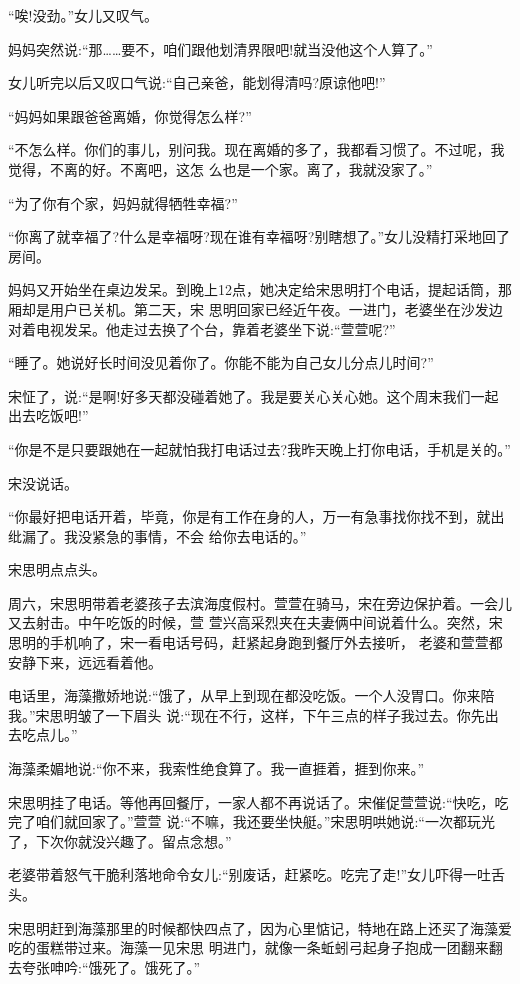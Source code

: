 \documentclass[11pt,a4paper,onecolumn]{article}
\begin{document}
``唉!没劲。''女儿又叹气。

妈妈突然说:``那……要不，咱们跟他划清界限吧!就当没他这个人算了。''

女儿听完以后又叹口气说:``自己亲爸，能划得清吗?原谅他吧!''

``妈妈如果跟爸爸离婚，你觉得怎么样?''

``不怎么样。你们的事儿，别问我。现在离婚的多了，我都看习惯了。不过呢，我觉得，不离的好。不离吧，这怎
么也是一个家。离了，我就没家了。''

``为了你有个家，妈妈就得牺牲幸福?''

``你离了就幸福了?什么是幸福呀?现在谁有幸福呀?别瞎想了。''女儿没精打采地回了房间。

妈妈又开始坐在桌边发呆。到晚上12点，她决定给宋思明打个电话，提起话筒，那厢却是用户已关机。第二天，宋
思明回家已经近午夜。一进门，老婆坐在沙发边对着电视发呆。他走过去换了个台，靠着老婆坐下说:``萱萱呢?''

``睡了。她说好长时间没见着你了。你能不能为自己女儿分点儿时间?''

宋怔了，说:``是啊!好多天都没碰着她了。我是要关心关心她。这个周末我们一起出去吃饭吧!''

``你是不是只要跟她在一起就怕我打电话过去?我昨天晚上打你电话，手机是关的。''

宋没说话。

``你最好把电话开着，毕竟，你是有工作在身的人，万一有急事找你找不到，就出纰漏了。我没紧急的事情，不会
给你去电话的。''

宋思明点点头。

周六，宋思明带着老婆孩子去滨海度假村。萱萱在骑马，宋在旁边保护着。一会儿又去射击。中午吃饭的时候，萱
萱兴高采烈夹在夫妻俩中间说着什么。突然，宋思明的手机响了，宋一看电话号码，赶紧起身跑到餐厅外去接听，
老婆和萱萱都安静下来，远远看着他。

电话里，海藻撒娇地说:``饿了，从早上到现在都没吃饭。一个人没胃口。你来陪我。''宋思明皱了一下眉头
说:``现在不行，这样，下午三点的样子我过去。你先出去吃点儿。''

海藻柔媚地说:``你不来，我索性绝食算了。我一直捱着，捱到你来。''

宋思明挂了电话。等他再回餐厅，一家人都不再说话了。宋催促萱萱说:``快吃，吃完了咱们就回家了。''萱萱
说:``不嘛，我还要坐快艇。''宋思明哄她说:``一次都玩光了，下次你就没兴趣了。留点念想。''

老婆带着怒气干脆利落地命令女儿:``别废话，赶紧吃。吃完了走!''女儿吓得一吐舌头。

宋思明赶到海藻那里的时候都快四点了，因为心里惦记，特地在路上还买了海藻爱吃的蛋糕带过来。海藻一见宋思
明进门，就像一条蚯蚓弓起身子抱成一团翻来翻去夸张呻吟:``饿死了。饿死了。''
\end{document}
